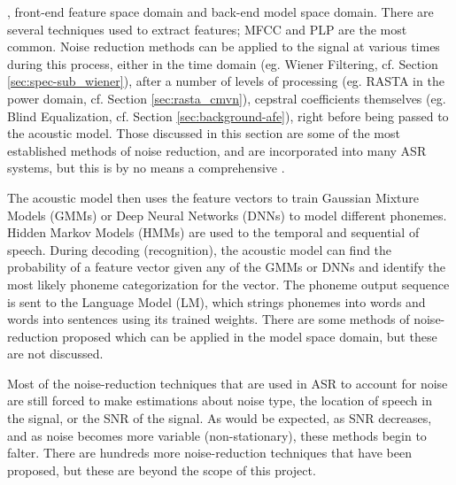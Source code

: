\DIFdelbegin {}\DIFdelend \DIFaddbegin {}\DIFaddend , front-end feature space domain and back-end model space domain.  There are several techniques used to extract features; MFCC and PLP are the most common. Noise reduction methods can be applied to the signal at various times during this process, either in the time domain (eg. Wiener Filtering, cf. Section \ref{sec:spec-sub_wiener}), \DIFdelbegin {}\DIFdelend after a number of levels of processing (eg. RASTA in the power domain, cf. Section \ref{sec:rasta_cmvn}), \DIFdelbegin {}\DIFdelend \DIFaddbegin {}\DIFaddend cepstral coefficients themselves (eg. Blind Equalization, cf. Section \ref{sec:background-afe}), right before being passed to the acoustic model.  Those discussed in this section are some of the most established methods of noise reduction, and are incorporated into many ASR systems, but this is by no means a comprehensive \DIFdelbegin {}\DIFdelend \DIFaddbegin {}\DIFaddend .  

The acoustic model then uses the feature vectors to train Gaussian Mixture Models (GMMs) or Deep Neural Networks (DNNs) to model different phonemes.  Hidden Markov Models (HMMs) are used to \DIFdelbegin {}\DIFdelend \DIFaddbegin {}\DIFaddend the temporal and sequential \DIFdelbegin {}\DIFdelend \DIFaddbegin {}\DIFaddend of speech. During decoding (recognition), the acoustic model can find the probability of a feature vector given any of the GMMs or DNNs \DIFdelbegin \DIFdel{, }\DIFdelend and identify the most likely phoneme categorization for the vector.  The phoneme output sequence is sent to the Language Model (LM), which strings phonemes into words and words into sentences using its trained weights.  There are some methods of noise-reduction proposed which can be applied in the model space domain, but these are not discussed.

Most of the noise-reduction techniques that are used in ASR to account for noise are still forced to make estimations about noise type, the location of speech in the signal, or the SNR of the signal.  As would be expected, as SNR decreases, and as noise becomes more variable (non-stationary), these methods begin to falter.  There are hundreds more noise-reduction techniques that have been proposed, but these are beyond the scope of this project.

